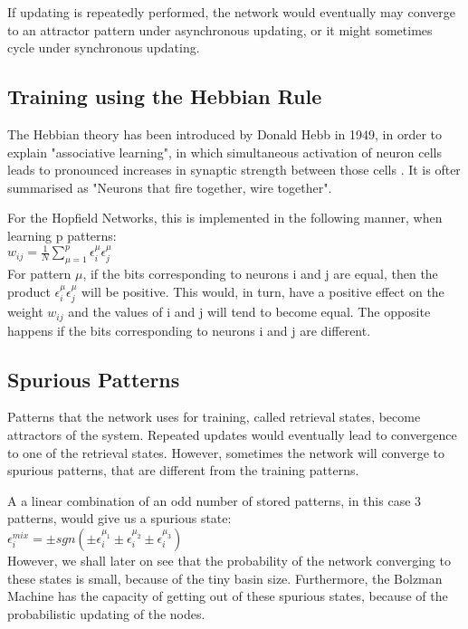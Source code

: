 If updating is repeatedly performed, the network would eventually may converge to an attractor pattern under asynchronous updating, or it might sometimes cycle under synchronous updating. 

\subsection{Training using the Hebbian Rule}

The Hebbian theory has been introduced by Donald Hebb in 1949, in order to explain "associative learning", in which simultaneous activation of neuron cells leads to pronounced increases in synaptic strength between those cells \cite{hebb_wiki}. It is ofter summarised as "Neurons that fire together, wire together". 

For the Hopfield Networks, this is implemented in the following manner, when learning p patterns:\\

\( w_{ij}=\frac{1}{N}\sum_{\mu=1}^{p}\epsilon_{i}^\mu \epsilon_{j}^\mu \)\\

For pattern \(\mu\), if the bits corresponding to neurons i and j are equal, then the product  \( \epsilon_{i}^\mu \epsilon_{j}^\mu \) will be positive. This would, in turn, have a positive effect on the weight \(w_{ij} \) and the values of i and j will tend to become equal. The opposite happens if the bits corresponding to neurons i and j are different.

\subsection{Spurious Patterns}

Patterns that the network uses for training, called retrieval states, become attractors of the system. Repeated updates would eventually lead to convergence to one of the retrieval states. However, sometimes the network will converge to spurious patterns, that are different from the training patterns. 

A a linear combination of an odd number of stored patterns, in this case 3 patterns, would give us a spurious state:\\

\( \epsilon_{i}^{mix} = \pm sgn(\pm \epsilon_{i}^{\mu_{1}} 
			         \pm \epsilon_{i}^{\mu_{2}}
			         \pm \epsilon_{i}^{\mu_{3}}) \)\\

However, we shall later on see that the probability of the network converging to these states is small, because of the tiny basin size. Furthermore, the Bolzman Machine has the capacity of getting out of these spurious states, because of the probabilistic updating of the nodes.			       

